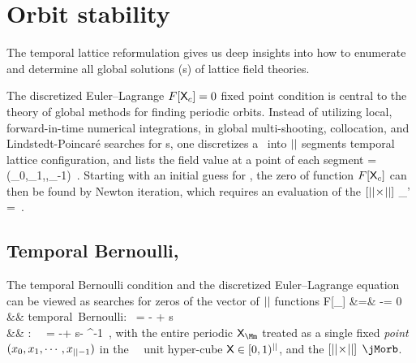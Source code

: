 
\section{Orbit stability}
\label{s:JacobianOrb}

The {temporal lattice} reformulation gives us deep insights into how to
enumerate and determine all global solutions ({\lattstate}s) of
lattice field theories.

The discretized Euler–\-Lagrange
$F[\mathsf{X}_c]=0$ fixed point condition  is central to the
theory of {global methods} for finding periodic orbits. Instead of
utilizing local, forward-in-time numerical integrations, in
global multi-shooting,
collocation, and Lindstedt-Poincar{\'e}
searches for \po s, one discretizes a \po\ into ${||}$
segments temporal lattice
configuration,
and lists the field value at a point of each segment
\beq
\transp{\Xx}=(\ssp_0,\ssp_{1},\cdots,\ssp_{\cl{}-1})
\,.
Starting with an initial guess for \Xx, the zero of function
$F[\mathsf{X}_c]$ can then be found by Newton iteration, which requires
an evaluation of the $[{||}\!\times\!{||}]$ \emph{\jacobianOrb}
\beq
\jMorb_{\zeit\zeit'} =
\,.

\subsection{Temporal Bernoulli, {\templatt}} %
\label{s:JacobianOrbBern}

The {temporal Bernoulli} condition
 and
the
{\templatt} discretized Euler–\-Lagrange equation 
can be viewed as searches for zeros of the vector of
${||}$ functions
\bea
F[\Xx_\Mm] &=& \jMorb\Xx-\Mm = 0
                \label{tempFixPoint}\\
&& \mbox{temporal Bernoulli: } \qquad \jMorb =  - {\shift} + {s}\id
                \label{bernFixPoint}\\
&& \mbox{\templatt: } \qquad\qquad\;\;\,    \jMorb =  -\shift + s\id - \shift^{-1}
                \label{tempCatFix}
\,,
\eea
with the entire periodic \emph{{\lattstate}} ${\Xx}_{\Mm}$ treated as a
single fixed \emph{point} $(x_0,x_{1},\cdots,x_{{||}-1})$ in the
\cl{}\dmn\ \statesp\ unit hyper-cube $\mathsf{X}\in[0,1)^{||}$, and
the $[{||}\!\times\!{||}]$ {\jacobianOrb}  $\jMorb$.


